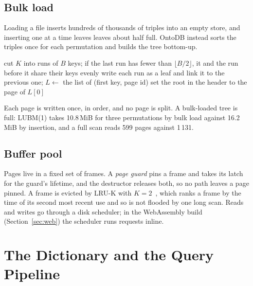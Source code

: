 \documentclass[sigconf, nonacm]{acmart}
\newcommand{\sys}{OntoDB}
\begin{document}
\subsection{Bulk load}

Loading a file inserts hundreds of thousands of triples into an empty store, and inserting one at a time leaves leaves about half full. \sys{} instead sorts the triples once for each permutation and builds the tree bottom-up.

\begin{algorithm}[t]
\caption{\textsc{BulkLoad}$(K)$ for sorted, unique keys $K$}\label{alg:bulk}
\small
cut $K$ into runs of $B$ keys; if the last run has fewer than $\lfloor B/2\rfloor$, it and the run before it share their keys evenly\;
write each run as a leaf and link it to the previous one; $L \gets$ the list of (first key, page id)\;
set the root in the header to the page of $L[0]$\;
\end{algorithm}

Each page is written once, in order, and no page is split. A bulk-loaded tree is full: LUBM(1) takes 10.8\,MiB for three permutations by bulk load against 16.2\,MiB by insertion, and a full scan reads 599 pages against 1\,131.

\subsection{Buffer pool}

Pages live in a fixed set of frames. A \emph{page guard} pins a frame and takes its latch for the guard's lifetime, and the destructor releases both, so no path leaves a page pinned. A frame is evicted by LRU-K with $K{=}2$~\cite{oneil1993}, which ranks a frame by the time of its second most recent use and so is not flooded by one long scan. Reads and writes go through a disk scheduler; in the WebAssembly build (Section~\ref{sec:web}) the scheduler runs requests inline.

\section{The Dictionary and the Query Pipeline}
\label{sec:query}
\end{document}
